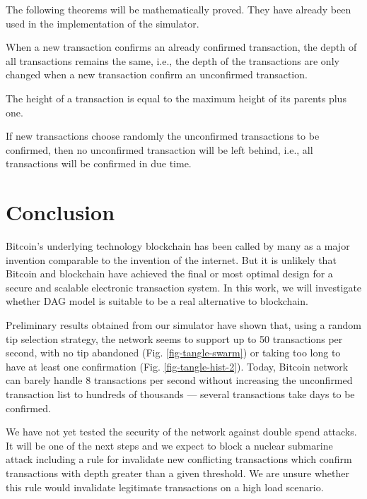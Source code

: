 The following theorems will be mathematically proved. They have already been used in the implementation of the simulator.

\begin{theorem}
\label{theorem-new-tx-not-tip}
When a new transaction confirms an already confirmed transaction, the depth of all transactions remains the same, i.e., the depth of the transactions are only changed when a new transaction confirm an unconfirmed transaction.
\end{theorem}

\begin{theorem}
The height of a transaction is equal to the maximum height of its parents plus one.
\end{theorem}

\begin{theorem}
If new transactions choose randomly the unconfirmed transactions to be confirmed, then no unconfirmed transaction will be left behind, i.e., all transactions will be confirmed in due time.
\end{theorem}

\chapter{Conclusion}

Bitcoin's underlying technology blockchain has been called by many as a major invention comparable to the invention of the internet. But it is unlikely that Bitcoin and blockchain have achieved the final or most optimal design for a secure and scalable electronic transaction system. In this work, we will investigate whether DAG model is suitable to be a real alternative to blockchain.

Preliminary results obtained from our simulator have shown that, using a random tip selection strategy, the network seems to support up to 50 transactions per second, with no tip abandoned (Fig. \ref{fig-tangle-swarm}) or taking too long to have at least one confirmation (Fig. \ref{fig-tangle-hist-2}). Today, Bitcoin network can barely handle 8 transactions per second without increasing the unconfirmed transaction list to hundreds of thousands --- several transactions take days to be confirmed.

We have not yet tested the security of the network against double spend attacks. It will be one of the next steps and we expect to block a nuclear submarine attack including a rule for invalidate new conflicting transactions which confirm transactions with depth greater than a given threshold. We are unsure whether this rule would invalidate legitimate transactions on a high load scenario.

